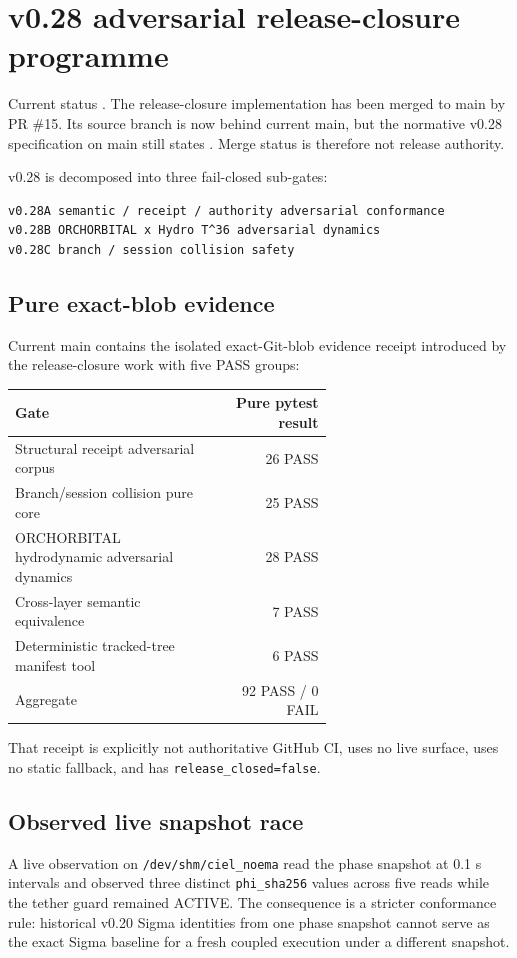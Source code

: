 \chapter{v0.28 adversarial release-closure programme}

\begin{statusbox}{Current status}
. The release-closure implementation has been merged to main by PR \#15. Its source branch is now behind current main, but the normative v0.28 specification on main still states . Merge status is therefore not release authority.
\end{statusbox}

v0.28 is decomposed into three fail-closed sub-gates:
\begin{lstlisting}
v0.28A semantic / receipt / authority adversarial conformance
v0.28B ORCHORBITAL x Hydro T^36 adversarial dynamics
v0.28C branch / session collision safety
\end{lstlisting}

\section{Pure exact-blob evidence}
Current main contains the isolated exact-Git-blob evidence receipt introduced by the release-closure work with five PASS groups:
\begin{longtable}{p{0.63\linewidth}r}
\toprule
Gate & Pure pytest result\\\midrule
Structural receipt adversarial corpus & 26 PASS\\
Branch/session collision pure core & 25 PASS\\
ORCHORBITAL hydrodynamic adversarial dynamics & 28 PASS\\
Cross-layer semantic equivalence & 7 PASS\\
Deterministic tracked-tree manifest tool & 6 PASS\\\midrule
Aggregate & 92 PASS / 0 FAIL\\\bottomrule
\end{longtable}
That receipt is explicitly not authoritative GitHub CI, uses no live surface, uses no static fallback, and has \texttt{release\_closed=false}.

\section{Observed live snapshot race}
A live observation on \texttt{/dev/shm/ciel\_noema} read the phase snapshot at 0.1 s intervals and observed three distinct \texttt{phi\_sha256} values across five reads while the tether guard remained ACTIVE. The consequence is a stricter conformance rule: historical v0.20 Sigma identities from one phase snapshot cannot serve as the exact Sigma baseline for a fresh coupled execution under a different snapshot.


